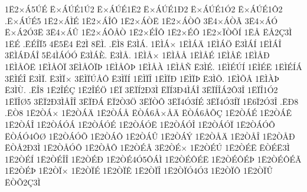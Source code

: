 {1^^cb2^^d7^^c15^^da^^c9
^^cb^^d7^^c1^^da^^c91^^da2
^^cb^^d7^^c1^^da^^c91^^cb2
^^cb^^d7^^c1^^da^^c91^^d02
^^cb^^d7^^c1^^da^^c91^^d32
^^cb^^d7^^c1^^da^^c91^^d42
.^^cb^^d7^^c1^^da^^c95
1^^cb2^^d7^^c1^^cc^^c9
1^^cb2^^d7^^c1^^ce^^d4
1^^cb2^^d7^^c1^^d2^^cb
1^^cb2^^d7^^c1^^d2^^d4
3^^cb4^^d7^^c1^^d2^^c3
3^^cb4^^d7^^c1^^d3
^^cb^^d7^^c12^^d33^^cb
3^^cb4^^d7^^c1^^db
1^^cb2^^d7^^c1^^d4^^c5^^d2
1^^cb2^^d7^^c9^^ce^^d4
1^^cb2^^d7^^c9^^d4
1^^cb2^^d7^^cf^^d2^^d5^^cd
1^^cb^^c5
^^cb^^c52^^c73^^cc
1^^cb^^c9
.^^cb^^c9^^ce^^cf5
4^^cb5^^cb4
^^cb2^^cc
8^^cb^^cc.
.^^cb^^cc8
^^cb3^^cc^^c1.
1^^cb^^cc^^c1^^d7
1^^cb^^cc^^c1^^c4
1^^cb^^cc^^c1^^d6
^^cb3^^cc^^c1^^cd
1^^cb^^cc^^c1^^ce
3^^cb^^cc^^c1^^d0^^c1^^ce
5^^cb4^^cc^^c1^^d3^^d3
^^cb3^^cc^^c1^^c8.
^^cb3^^cc^^c5.
1^^cb^^cc^^c5^^d7
1^^cb^^cc^^c5^^c5
1^^cb^^cc^^c5^^c9
1^^cb^^cc^^c5^^ca
1^^cb^^cc^^c5^^d0
1^^cb^^cc^^c5^^d4^^cb
1^^cb^^cc^^c5^^d4^^cf
3^^cb^^cc^^c5^^d4^^cf^^de
1^^cb^^cc^^c5^^d4^^de
1^^cb^^cc^^c5^^c0
1^^cb^^cc^^c5^^d1
^^cb3^^cc^^c9.
1^^cb^^cc^^c9^^da^^cd
1^^cb^^cc^^c9^^cb
1^^cb^^cc^^c9^^cd^^c1
3^^cb^^cc^^c9^^ce
^^cb3^^cc^^cf.
^^cb3^^cc^^cf^^d7
3^^cb^^cc^^cf^^da^^c5^^d4
^^cb3^^cc^^cf^^cd
1^^cb^^cc^^cf^^ce
1^^cb^^cc^^cf^^d0
1^^cb^^cc^^cf^^de
^^cb3^^cc^^d5.
1^^cb^^cc^^d5^^c2
1^^cb^^cc^^c0^^de
^^cb3^^cc^^d9.
.^^cb^^ce8
1^^cb2^^ce^^c9^^c7
1^^cb2^^ce^^c9^^d6
1^^cb^^cf
3^^cb^^cf^^cd2^^d03^^cc
^^cb^^cf^^cd3^^d04^^cc^^c1^^ce
3^^cb^^cf^^cd^^ce^^c12^^d43^^ce
1^^cb^^cf^^ce1^^d32
1^^cb^^cf^^ce^^d85
3^^cb^^cf2^^d03^^cc^^c5^^ce^^ce
3^^cb^^cf^^d0^^c1
^^cb^^cf2^^d23^^d6
3^^cb^^cf^^d2^^d4
3^^cb^^cf4^^d33^^cd^^c9
3^^cb^^cf4^^d33^^cd^^cf
1^^cb6^^cf2^^d33^^ce
.^^cb^^d08
.^^cb^^d28
1^^cb2^^d2^^c1^^d7
1^^cb2^^d2^^c1^^c4
1^^cb2^^d2^^c1^^c5
^^cb^^d2^^c16^^c5^^d7^^c5^^c4
^^cb^^d2^^c16^^c5^^d5^^c7
1^^cb2^^d2^^c1^^c9
1^^cb2^^d2^^c1^^ca
1^^cb2^^d2^^c1^^ce
1^^cb2^^d2^^c1^^d3^^c1
1^^cb2^^d2^^c1^^d3^^c9
1^^cb2^^d2^^c1^^d3^^cb
1^^cb2^^d2^^c1^^d3^^ce
1^^cb2^^d2^^c1^^d3^^cf
1^^cb2^^d2^^c1^^d3^^d4
^^cb^^d2^^c1^^d34^^d4^^d8
1^^cb2^^d2^^c1^^d3^^d5
1^^cb2^^d2^^c1^^d4
1^^cb2^^d2^^c1^^db
1^^cb2^^d2^^c1^^dd
1^^cb2^^d2^^c5^^c4
1^^cb2^^d2^^c5^^ce
1^^cb2^^d2^^c5^^d0
^^cb^^d2^^c52^^d03^^cc
1^^cb2^^d2^^c5^^d3^^d4
1^^cb2^^d2^^c5^^d4
1^^cb2^^d2^^c9^^c2
3^^cb2^^d2^^c9^^d7
1^^cb2^^d2^^c9^^da
1^^cb2^^d2^^c9^^cb
^^cb^^d2^^c9^^cb3^^cc
1^^cb2^^d2^^c9^^cd
1^^cb2^^d2^^c9^^ce^^ce
1^^cb2^^d2^^c9^^d0
1^^cb2^^d2^^c94^^d35^^d4^^c1^^cc
1^^cb2^^d2^^c9^^d4^^c9^^cb
1^^cb2^^d2^^c9^^d4^^c9^^de
1^^cb2^^d2^^c9^^d4^^c9^^c3
1^^cb2^^d2^^c9^^de
1^^cb2^^d2^^cf^^d7
1^^cb2^^d2^^cf^^c9
1^^cb2^^d2^^cf^^ca
1^^cb2^^d2^^cf^^ce
1^^cb2^^d2^^cf^^d34^^d33
1^^cb2^^d2^^cf^^d4
1^^cb2^^d2^^cf^^db
^^cb^^d2^^d52^^c73^^cc
}
